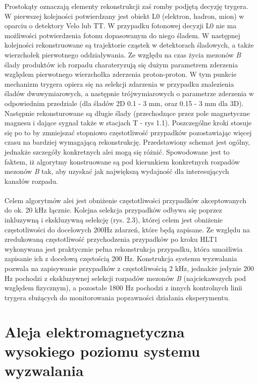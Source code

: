\documentclass{pracamgr}
\begin{document}
\noindent
Prostokąty oznaczają elementy rekonstrukcji zaś romby podjętą decyzję trygera. W pierwszej kolejności potwierdzany jest obiekt L0 (elektron, hadron, mion) w oparciu o detektory Velo lub TT. W przypadku fotonowej decyzji L0 nie ma możliwości potwierdzenia fotonu dopasowanym do niego śladem. W następnej kolejności rekonstruowane są trajektorie cząstek w detektorach śladowych, a także wierzchołek pierwotnego oddziaływania. Ze względu na czas życia mezonów \textit{B} ślady produktów ich rozpadu charateryzują się dużym parametrem zderzenia względem pierwotnego wierzchołka zderzenia proton-proton. W tym punkcie mechanizm trygera opiera się na selekcji zdarzenia w przypadku znalezienia śladów dwuwymiarowych, a następnie trójwymiarowych o parametrze zderzenia w odpowiednim przedziale (dla śladów 2D 0.1 - 3 mm, oraz 0.15 - 3 mm dla 3D). Następnie rekonsturowane są długie ślady (przechodzące przez pole magnetyczne magnesu i dające sygnał także w stacjach T - rys 1.1). Poszczególne kroki stosuje się po to by zmniejszać stopniowo częstotliwość przypadków pozostawiając więcej czasu na bardziej wymagającą rekonstrukcję. Przedstawiony schemat jest ogólny, jednakże szczegóły konkretnych alei mogą się różnić. Spowodowane jest to faktem, iż algorytmy konstruowane są pod kierunkiem konkretnych rozpadów mezonów \textit{B} tak, aby uzyskać jak największą wydajność dla interesujących kanałów rozpadu. 
\\\\
\noindent
Celem algorytmów alei jest obniżenie częstotliwości przypadków akceptowanych do ok. 20 kHz łącznie. Kolejna selekcja przypadków odbywa się poprzez inkluzywną i ekskluzywną selekcję (rys. 2.3), której celem jest obniżenie częstotliwości do docelowych 200Hz zdarzeń, które będą zapisane. Ze względu na zredukowaną częstotliwość przychodzenia przypadków po kroku HLT1 wykonywana jest praktycznie pełna rekonstrukcja przypadku, która umożliwia zapisanie ich z docelową częstością 200 Hz. Konstrukcja systemu wyzwalania pozwala na zapisywanie przypadków z częstotliwością 2 kHz, jednakże jedynie 200 Hz pochodzi z ekskluzywnej selekcji rozpadów mezonów \textit{B} (najciekawszych pod względem fizycznym), a pozostałe 1800 Hz pochodzi z innych kontrolnych linii trygera służących do monitorowania poprawności działania eksperymentu.

\section{Aleja elektromagnetyczna wysokiego poziomu systemu wyzwalania}
\end{document}
